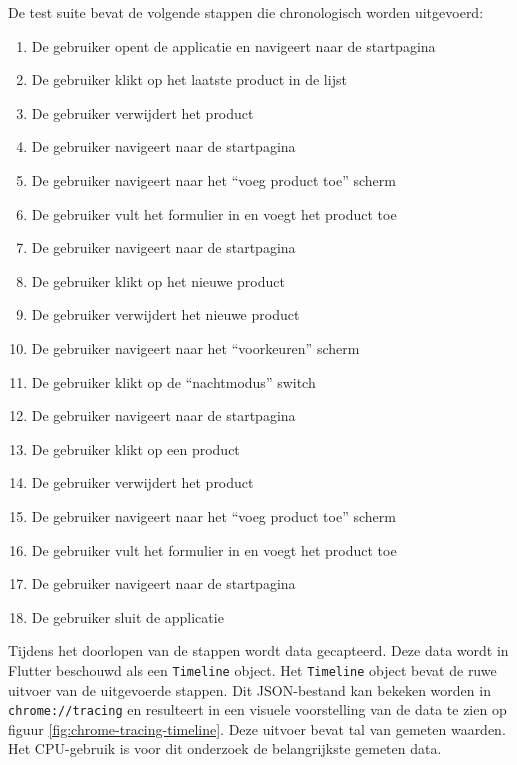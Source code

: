 De test suite bevat de volgende stappen die chronologisch worden uitgevoerd:
\begin{enumerate}
    \item De gebruiker opent de applicatie en navigeert naar de startpagina
    \item De gebruiker klikt op het laatste product in de lijst
    \item De gebruiker verwijdert het product
    \item De gebruiker navigeert naar de startpagina
    \item De gebruiker navigeert naar het ``voeg product toe'' scherm
    \item De gebruiker vult het formulier in en voegt het product toe
    \item De gebruiker navigeert naar de startpagina
    \item De gebruiker klikt op het nieuwe product
    \item De gebruiker verwijdert het nieuwe product
    \item De gebruiker navigeert naar het ``voorkeuren'' scherm
    \item De gebruiker klikt op de ``nachtmodus'' switch
    \item De gebruiker navigeert naar de startpagina
    \item De gebruiker klikt op een product
    \item De gebruiker verwijdert het product
    \item De gebruiker navigeert naar het ``voeg product toe'' scherm
    \item De gebruiker vult het formulier in en voegt het product toe
    \item De gebruiker navigeert naar de startpagina
    \item De gebruiker sluit de applicatie
\end{enumerate}


Tijdens het doorlopen van de stappen wordt data gecapteerd. Deze data wordt in Flutter beschouwd als een \verb|Timeline| object. Het \verb|Timeline| object bevat de ruwe uitvoer van de uitgevoerde stappen. Dit JSON-bestand kan bekeken worden in \verb|chrome://tracing| en resulteert in een visuele voorstelling van de data te zien op figuur \ref{fig:chrome-tracing-timeline}. Deze uitvoer bevat tal van gemeten waarden. Het CPU-gebruik is voor dit onderzoek de belangrijkste gemeten data. \newline

